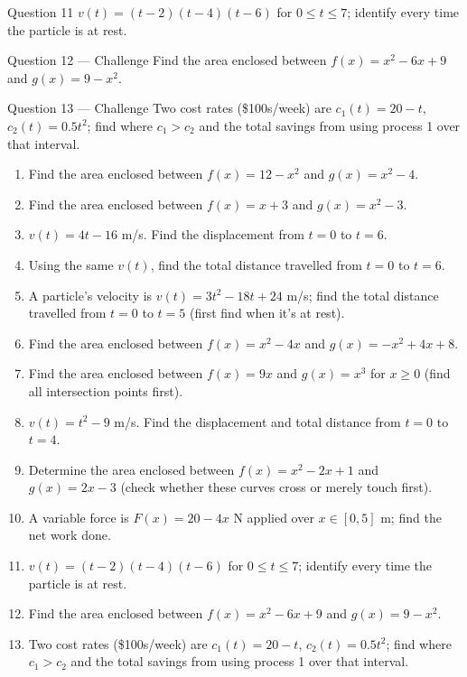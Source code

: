 \documentclass[11pt]{article}
\begin{document}
\begin{qbox}{Question 11}
$v(t)=(t-2)(t-4)(t-6)$ for $0\leq t\leq7$; identify every time the particle is at rest.\workspace{2.4cm}
\end{qbox}

\begin{qbox}{Question 12 --- Challenge}
Find the area enclosed between $f(x)=x^2-6x+9$ and $g(x)=9-x^2$.\workspace{3.4cm}
\end{qbox}

\begin{qbox}{Question 13 --- Challenge}
Two cost rates (\$100s/week) are $c_1(t)=20-t$, $c_2(t)=0.5t^2$; find where $c_1>c_2$ and the total savings from using process 1 over that interval.\workspace{3.4cm}
\end{qbox}

\clearpage
{}

\begin{recapbox}
\begin{multicols}{2}
\small
\begin{enumerate}[leftmargin=*,itemsep=3pt]
  \item Find the area enclosed between $f(x)=12-x^2$ and $g(x)=x^2-4$.
  \item Find the area enclosed between $f(x)=x+3$ and $g(x)=x^2-3$.
  \item $v(t)=4t-16$ m/s. Find the displacement from $t=0$ to $t=6$.
  \item Using the same $v(t)$, find the total distance travelled from $t=0$ to $t=6$.
  \item A particle's velocity is $v(t)=3t^2-18t+24$ m/s; find the total distance travelled from $t=0$ to $t=5$ (first find when it's at rest).
  \item Find the area enclosed between $f(x)=x^2-4x$ and $g(x)=-x^2+4x+8$.
  \item Find the area enclosed between $f(x)=9x$ and $g(x)=x^3$ for $x\geq0$ (find all intersection points first).
  \item $v(t)=t^2-9$ m/s. Find the displacement and total distance from $t=0$ to $t=4$.
  \item Determine the area enclosed between $f(x)=x^2-2x+1$ and $g(x)=2x-3$ (check whether these curves cross or merely touch first).
  \item A variable force is $F(x)=20-4x$ N applied over $x\in[0,5]$ m; find the net work done.
  \item $v(t)=(t-2)(t-4)(t-6)$ for $0\leq t\leq7$; identify every time the particle is at rest.
  \item Find the area enclosed between $f(x)=x^2-6x+9$ and $g(x)=9-x^2$.
  \item Two cost rates (\$100s/week) are $c_1(t)=20-t$, $c_2(t)=0.5t^2$; find where $c_1>c_2$ and the total savings from using process 1 over that interval.
\end{enumerate}
\end{multicols}
\end{recapbox}
\end{document}
